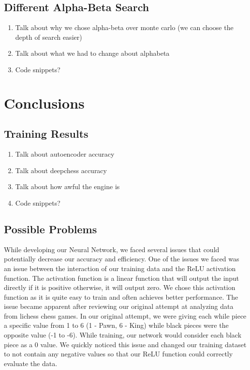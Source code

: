 \documentclass[12pt]{article}
\begin{document}
    \subsection{Different Alpha-Beta Search}

    \begin{enumerate}
        \item Talk about why we chose alpha-beta over monte carlo (we can choose the depth of search easier)
        \item Talk about what we had to change about alphabeta
        \item Code snippets?
    \end{enumerate}
    
    \section{Conclusions}

    \subsection{Training Results}

    \begin{enumerate}
        \item Talk about autoencoder accuracy 
        \item Talk about deepchess accuracy 
        \item Talk about how awful the engine is 
        \item Code snippets?
    \end{enumerate}

    \subsection{Possible Problems}

    While developing our Neural Network, we faced several issues that could potentially decrease our accuracy and efficiency. One of the issues we faced was an issue between the interaction of our training data and the ReLU activation function. The activation function is a linear function that will output the input directly if it is positive otherwise, it will output zero. We chose this activation function as it is quite easy to train and often achieves better performance. The issue became apparent after reviewing our original attempt at analyzing data from lichess chess games. In our original attempt, we were giving each while piece a specific value from 1 to 6 (1 - Pawn, 6 - King) while black pieces were the opposite value (-1 to -6). While training, our network would consider each black piece as a 0 value. We quickly noticed this issue and changed our training dataset to not contain any negative values so that our ReLU function could correctly evaluate the data. 
    
\end{document}
